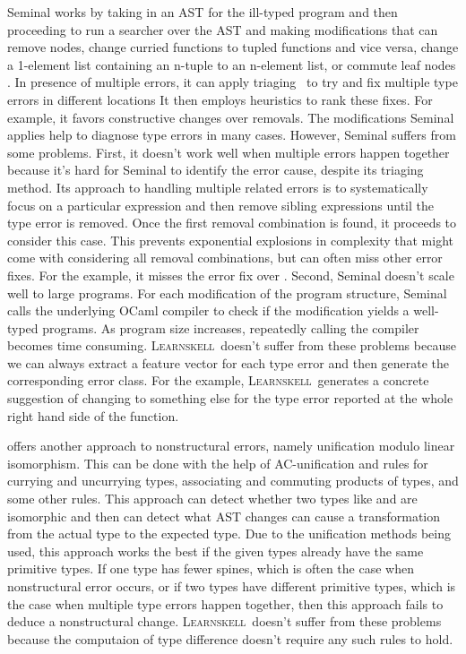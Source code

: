 \documentclass[12pt]{report}	%
\newcommand{\newCompiler}{\textsc{Learnskell}}
\begin{document}
Seminal works by taking in an AST for the ill-typed program
and then proceeding to run a searcher over the AST and
making modifications that can remove nodes, change curried functions
to tupled functions and vice versa, change a 1-element list containing an n-tuple to an n-element list, or commute leaf nodes \cite{Lerner07:STM}.
In presence of multiple errors, it can apply triaging~\cite{Lerner07:STM}
to try and fix multiple type errors in different locations
It then employs heuristics to rank
these fixes. For example, it favors constructive changes over removals.
The modifications Seminal applies help to diagnose type
errors in many cases. However, Seminal suffers from
some problems. First, it doesn't work well when multiple errors
happen together because it's hard for Seminal to identify the error
cause, despite its triaging method.
%
Its approach to handling
multiple related errors is to systematically focus on a particular
expression and then remove sibling expressions until the type
error is removed. Once the first removal combination is found, it
proceeds to consider this case.
This prevents exponential explosions in complexity
that might come with considering all removal combinations,
but can often miss other error fixes. For the  
example, it misses the error fix over .
%
Second, Seminal doesn't scale well to large programs.
For each modification of the program structure, Seminal calls
the underlying OCaml compiler to check if the modification yields
a well-typed programs. As program size increases, repeatedly calling
the compiler becomes time consuming.
%
\newCompiler\ doesn't suffer from these problems because
we can always extract a feature vector for each type error and
then generate the corresponding error class. 
For the  example,
\newCompiler\ generates a concrete suggestion of changing \prog{++}
to something else for the type error reported at the whole right
hand side of the function.

\cite{McAdam02:RTE} offers another approach to nonstructural errors, namely
unification modulo linear isomorphism.
This can be done with the help of AC-unification and rules for
currying and uncurrying types, associating and
commuting products of types, and some other rules.
This approach can detect whether two types like
 and  are isomorphic and then can detect what AST changes
can cause a transformation from the actual type to the expected type.
Due to the unification methods being used, this
approach works the best if the given types already have the same
primitive types. If one type has fewer spines, which is often the
case when nonstructural error occurs, or if two types have different
primitive types, which is the case when multiple type errors happen
together, then this approach fails to deduce a nonstructural change.
%
\newCompiler\ doesn't suffer from these problems because the computaion
of type difference doesn't require any such rules to hold.
\end{document}
